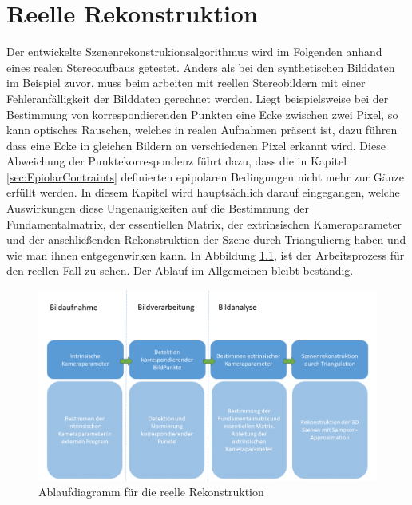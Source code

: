 \chapter{Reelle Rekonstruktion}
\label{sec:real} 

Der entwickelte Szenenrekonstrukionsalgorithmus wird im Folgenden anhand eines realen Stereoaufbaus getestet. Anders als bei den synthetischen Bilddaten im Beispiel zuvor, muss beim arbeiten mit reellen Stereobildern mit einer Fehleranfälligkeit der Bilddaten gerechnet werden. Liegt beispielsweise bei der Bestimmung von korrespondierenden Punkten eine Ecke zwischen zwei Pixel, so kann optisches Rauschen, welches in realen Aufnahmen präsent ist, dazu führen dass eine Ecke in gleichen Bildern an verschiedenen Pixel erkannt wird. Diese Abweichung der Punktekorrespondenz führt dazu, dass die in Kapitel \ref{sec:EpiolarContraints} definierten epipolaren Bedingungen nicht mehr zur Gänze erfüllt werden. In diesem Kapitel wird hauptsächlich darauf eingegangen, welche Auswirkungen diese Ungenauigkeiten auf die Bestimmung der Fundamentalmatrix, der essentiellen Matrix, der extrinsischen Kameraparameter und der anschließenden Rekonstruktion der Szene durch Triangulierng haben und wie man ihnen entgegenwirken kann. In Abbildung \ref{fig:ArbeitsProzessReell}, ist der Arbeitsprozess für den reellen Fall zu sehen. Der Ablauf im Allgemeinen bleibt beständig.

%

\begin{figure}[!htb]
	\centering
	\includegraphics[width=1.\linewidth]{images/NEU_real_Arbeitsprozess.png}
	\caption[Ablaufdiagramm für die reelle Rekonstruktion]{Ablaufdiagramm für die reelle Rekonstruktion}
	\label{fig:ArbeitsProzessReell}
\end{figure}

